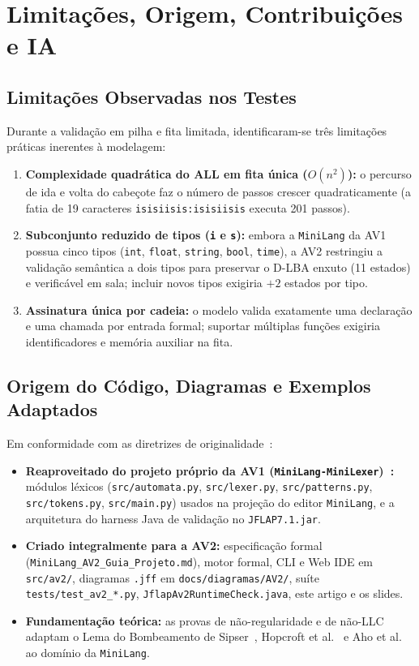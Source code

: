 \section{Limitações, Origem, Contribuições e IA}

\subsection{Limitações Observadas nos Testes}

Durante a validação em pilha e fita limitada, identificaram-se três limitações práticas inerentes à modelagem:
\begin{enumerate}
    \item \textbf{Complexidade quadrática do ALL em fita única ($O(n^2)$):} o percurso de ida e volta do cabeçote faz o número de passos crescer quadraticamente (a fatia de 19 caracteres \texttt{isisiisis:isisiisis} executa 201 passos).
    \item \textbf{Subconjunto reduzido de tipos (\texttt{i} e \texttt{s}):} embora a \texttt{MiniLang} da AV1 possua cinco tipos (\texttt{int}, \texttt{float}, \texttt{string}, \texttt{bool}, \texttt{time}), a AV2 restringiu a validação semântica a dois tipos para preservar o D-LBA enxuto (11 estados) e verificável em sala; incluir novos tipos exigiria $+2$ estados por tipo.
    \item \textbf{Assinatura única por cadeia:} o modelo valida exatamente uma declaração e uma chamada por entrada formal; suportar múltiplas funções exigiria identificadores e memória auxiliar na fita.
\end{enumerate}

\subsection{Origem do Código, Diagramas e Exemplos Adaptados}

Em conformidade com as diretrizes de originalidade~\cite{atividade}:
\begin{itemize}
    \item \textbf{Reaproveitado do projeto próprio da AV1 (\texttt{MiniLang-MiniLexer})~\cite{av1}:} módulos léxicos (\texttt{src/automata.py}, \texttt{src/lexer.py}, \texttt{src/patterns.py}, \texttt{src/tokens.py}, \texttt{src/main.py}) usados na projeção do editor \texttt{MiniLang}, e a arquitetura do harness Java de validação no \texttt{JFLAP7.1.jar}.
    \item \textbf{Criado integralmente para a AV2:} especificação formal (\texttt{MiniLang\_AV2\_Guia\_Projeto.md}), motor formal, CLI e Web IDE em \texttt{src/av2/}, diagramas \texttt{.jff} em \texttt{docs/diagramas/AV2/}, suíte \texttt{tests/test\_av2\_*.py}, \texttt{JflapAv2RuntimeCheck.java}, este artigo e os slides.
    \item \textbf{Fundamentação teórica:} as provas de não-regularidade e de não-LLC adaptam o Lema do Bombeamento de Sipser~\cite{sipser}, Hopcroft et al.~\cite{hopcroft} e Aho et al.~\cite{aho} ao domínio da \texttt{MiniLang}.
\end{itemize}

